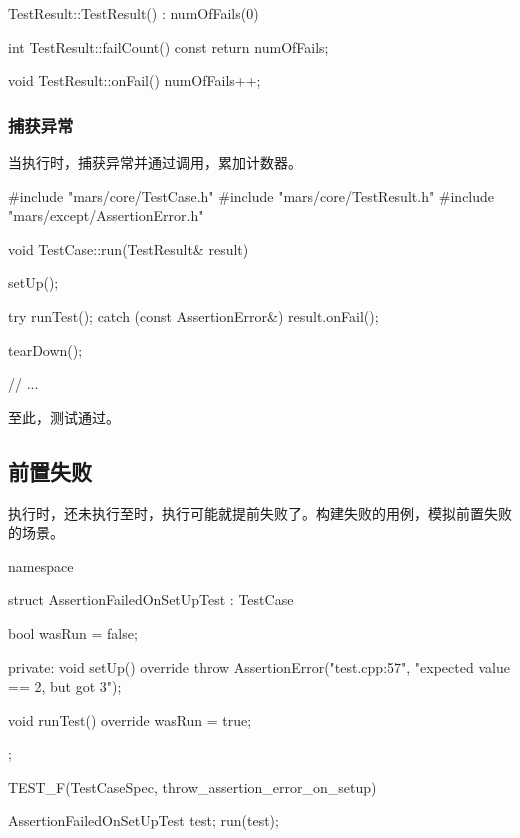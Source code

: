 \begin{content}
\begin{leftbar}
\begin{c++}[caption={\ttfamily{src/mars/core/TestResult.cc}}]
TestResult::TestResult() : numOfFails(0) {
}

int TestResult::failCount() const {
  return numOfFails;
}

void TestResult::onFail() {
  numOfFails++;
}
 \end{c++}
\end{leftbar}

\subsubsection{捕获异常}

当执行时，捕获异常并通过调用，累加计数器。

\begin{leftbar}
 \begin{c++}[caption={\ttfamily{src/mars/core/TestCase.cc}}]
#include "mars/core/TestCase.h"
#include "mars/core/TestResult.h"
#include "mars/except/AssertionError.h"

void TestCase::run(TestResult& result) {
  setUp();

  try {
    runTest();
  } catch (const AssertionError&) {
    result.onFail();
  }

  tearDown();
}

// ...
 \end{c++}
\end{leftbar}

至此，测试通过。

\subsection{前置失败}

执行时，还未执行至时，执行可能就提前失败了。构建失败的用例，模拟前置失败的场景。

\begin{leftbar}
 \begin{c++}[caption={\ttfamily{test/mars/TestCaseSpec.cc}}]
namespace {
  struct AssertionFailedOnSetUpTest : TestCase {
    bool wasRun = false;

  private:
    void setUp() override {
      throw AssertionError("test.cpp:57", "expected value == 2, but got 3");
    }

    void runTest() override {
      wasRun = true;
    }
  };
}

TEST_F(TestCaseSpec, throw_assertion_error_on_setup) {
  AssertionFailedOnSetUpTest test;
  run(test);

}
\end{c++}
\end{leftbar}
\end{content}
